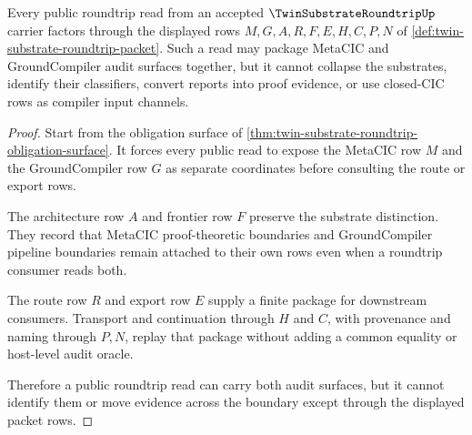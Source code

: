 \begin{theorem}
\label{thm:twin-substrate-roundtrip-noncollapse}
Every public roundtrip read from an accepted $\TwinSubstrateRoundtripUp$ carrier factors through the displayed rows $M,G,A,R,F,E,H,C,P,N$ of \autoref{def:twin-substrate-roundtrip-packet}. Such a read may package MetaCIC and GroundCompiler audit surfaces together, but it cannot collapse the substrates, identify their classifiers, convert reports into proof evidence, or use closed-CIC rows as compiler input channels.
\end{theorem}
\begin{proof}
Start from the obligation surface of \autoref{thm:twin-substrate-roundtrip-obligation-surface}. It forces every public read to expose the MetaCIC row $M$ and the GroundCompiler row $G$ as separate coordinates before consulting the route or export rows.

The architecture row $A$ and frontier row $F$ preserve the substrate distinction. They record that MetaCIC proof-theoretic boundaries and GroundCompiler pipeline boundaries remain attached to their own rows even when a roundtrip consumer reads both.

The route row $R$ and export row $E$ supply a finite package for downstream consumers. Transport and continuation through $H$ and $C$, with provenance and naming through $P,N$, replay that package without adding a common equality or host-level audit oracle.

Therefore a public roundtrip read can carry both audit surfaces, but it cannot identify them or move evidence across the boundary except through the displayed packet rows.
\end{proof}


\begin{closurestatus}{\TwinSubstrateRoundtripUp}
  \theoryclosure{\seedClosure}
  \formalstatus{\unformalizedV}
\end{closurestatus}
